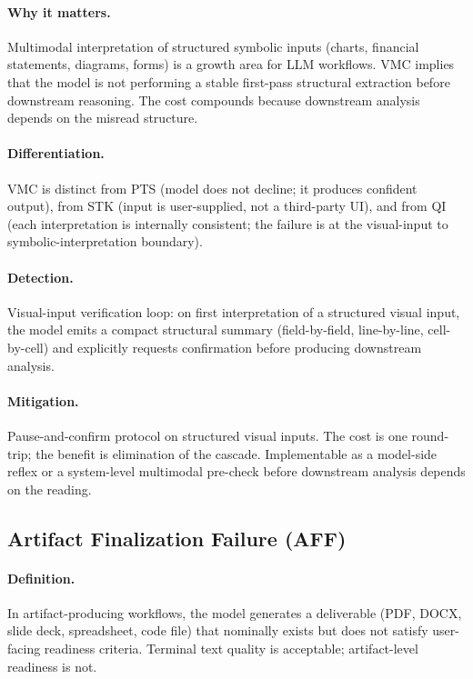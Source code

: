 \documentclass[11pt]{article}
\begin{document}
\paragraph{Why it matters.} Multimodal interpretation of structured symbolic inputs (charts, financial statements, diagrams, forms) is a growth area for LLM workflows. VMC implies that the model is not performing a stable first-pass structural extraction before downstream reasoning. The cost compounds because downstream analysis depends on the misread structure.

\paragraph{Differentiation.} VMC is distinct from PTS (model does not decline; it produces confident output), from STK (input is user-supplied, not a third-party UI), and from QI (each interpretation is internally consistent; the failure is at the visual-input to symbolic-interpretation boundary).

\paragraph{Detection.} Visual-input verification loop: on first interpretation of a structured visual input, the model emits a compact structural summary (field-by-field, line-by-line, cell-by-cell) and explicitly requests confirmation before producing downstream analysis.

\paragraph{Mitigation.} Pause-and-confirm protocol on structured visual inputs. The cost is one round-trip; the benefit is elimination of the cascade. Implementable as a model-side reflex or a system-level multimodal pre-check before downstream analysis depends on the reading.

\subsection{Artifact Finalization Failure (AFF)}
\paragraph{Definition.} In artifact-producing workflows, the model generates a deliverable (PDF, DOCX, slide deck, spreadsheet, code file) that nominally exists but does not satisfy user-facing readiness criteria. Terminal text quality is acceptable; artifact-level readiness is not.
\end{document}
